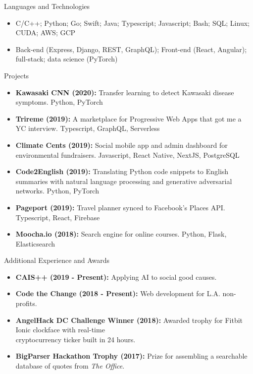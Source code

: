 \documentclass[calibri]{mcdowellcv}
\begin{document}
\begin{cvsection}{Languages and Technologies}
	\begin{cvsubsection}{}{}{}
		\begin{itemize}
			\item C/C++; Python; Go; Swift; Java; Typescript; Javascript; Bash; SQL; Linux; CUDA; AWS; GCP
			\item Back-end (Express, Django, REST, GraphQL); Front-end (React, Angular); full-stack; data science (PyTorch)
		\end{itemize}
	\end{cvsubsection}
\end{cvsection}

\begin{cvsection}{Projects}
	\begin{cvsubsection}{}{}{}
		\begin{itemize}
			\item \textbf{Kawasaki CNN (2020):} Transfer learning to detect Kawasaki disease symptoms. Python, PyTorch
			\item \textbf{Trireme (2019):} A marketplace for Progressive Web Apps that got me a YC interview. Typescript, GraphQL, Serverless
			\item \textbf{Climate Cents (2019):} Social mobile app and admin dashboard for environmental fundraisers. Javascript, React Native, NextJS, PostgreSQL
			\item \textbf{Code2English (2019):} Translating Python code snippets to English summaries with natural language processing and generative adversarial networks. Python, PyTorch
			\item \textbf{Pageport (2019):} Travel planner synced to Facebook's Places API. Typescript, React, Firebase
			\item \textbf{Moocha.io (2018):} Search engine for online courses. Python, Flask, Elasticsearch
		\end{itemize}
	\end{cvsubsection}
\end{cvsection}

\begin{cvsection}{Additional Experience and Awards}
	\begin{cvsubsection}{}{}{}
		\begin{itemize}
			\item \textbf{CAIS++ (2019 - Present):} Applying AI to social good causes.
			\item \textbf{Code the Change (2018 - Present):} Web development for L.A. non-profits.
			\item \textbf{AngelHack DC Challenge Winner (2018):} Awarded trophy for Fitbit Ionic clockface with real-time \\cryptocurrency ticker built in 24 hours.
			\item \textbf{BigParser Hackathon Trophy (2017):} Prize for assembling a searchable database of quotes from \textit{The Office}.
		\end{itemize}
	\end{cvsubsection}
\end{cvsection}
\end{document}
